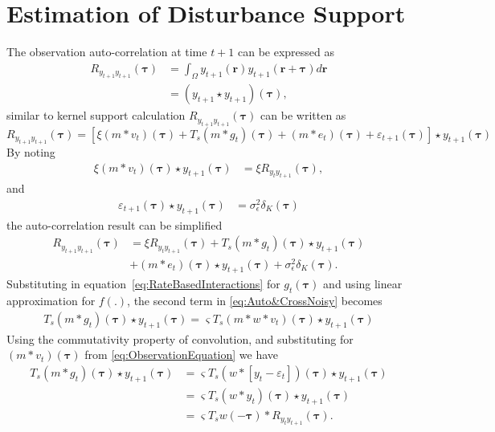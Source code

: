 \documentclass[]{article}
\begin{document}
\section*{Estimation of Disturbance Support}
The observation auto-correlation at time $t+1$ can be expressed as
\begin{align}
	R_{y_{t+1}y_{t+1}}(\boldsymbol{\tau})& =\int_{\Omega} y_{t+1}(\mathbf{r}) y_{t+1}(\mathbf{r}+\boldsymbol{\tau}) d\mathbf{r}
 \nonumber \\
 &=(y_{t+1} \star y_{t+1})(\boldsymbol\tau),
\end{align}
similar to  kernel support calculation $R_{y_{t+1}y_{t+1}}(\boldsymbol{\tau})$ can be written as 
\begin{equation}
	R_{y_{t+1}y_{t+1}}(\boldsymbol{\tau}) = \left[  \xi(m\ast v_{t})(\boldsymbol\tau)+T_s(m\ast g_{t})(\boldsymbol\tau)+(m\ast e_{t})(\boldsymbol{\tau})+\varepsilon_{t+1}(\boldsymbol\tau)\right] \star  y_{t+1}(\boldsymbol{\tau}) 
\end{equation}
By noting 
\begin{align}\label{eq:term1}
  \xi(m\ast v_{t})(\boldsymbol\tau)\star  y_{t+1}(\boldsymbol{\tau})&=\xi R_{y_ty_{t+1}}(\boldsymbol{\tau}),
\end{align}
and
\begin{align}\label{eq:term2}
 \varepsilon_{t+1}(\boldsymbol\tau)\star y_{t+1}(\boldsymbol\tau)&=\sigma_{\epsilon}^2\delta_K(\boldsymbol{\tau})
\end{align}
the auto-correlation result can be simplified
\begin{align}\label{eq:Auto&CrossNoisy}
	R_{y_{t+1}y_{t+1}}(\boldsymbol{\tau}) &= \xi R_{y_ty_{t+1}}(\boldsymbol{\tau})+ T_s (m\ast g_t)(\boldsymbol\tau) \star y_{t+1}(\boldsymbol\tau) \nonumber \\
	&+(m\ast e_t)(\boldsymbol\tau)\star y_{t+1}(\boldsymbol\tau)+\sigma_{\epsilon}^2\delta_K(\boldsymbol{\tau}).
\end{align}
Substituting in equation~\ref{eq:RateBasedInteractions} for $g_t(\boldsymbol\tau)$ and using linear approximation for $f(.)$, the second term in \eqref{eq:Auto&CrossNoisy} becomes
\begin{align}
	 T_s (m\ast g_t)(\boldsymbol\tau) \star y_{t+1}(\boldsymbol\tau) = \varsigma T_s(m\ast w*v_t)(\boldsymbol\tau) \star y_{t+1}(\boldsymbol\tau)
\end{align}
Using the commutativity property of convolution, and substituting for $(m\ast v_t)(\boldsymbol\tau)$ from \ref{eq:ObservationEquation} we have
\begin{align}\label{eq:term3}
	T_s (m\ast g_t)(\boldsymbol\tau) \star y_{t+1}(\boldsymbol\tau)&=  \varsigma T_s \left( w\ast \left[y_t-\varepsilon_t \right]\right)(\boldsymbol\tau) \star y_{t+1}(\boldsymbol\tau) \nonumber \\
&=\varsigma T_s(w\ast y_t)(\boldsymbol{\tau}) \star  y_{t+1}(\boldsymbol{\tau}) \nonumber \\
&=\varsigma T_s w(-\boldsymbol\tau)\ast R_{y_ty_{t+1}} (\boldsymbol{\tau}). 
\end{align}
\end{document}

